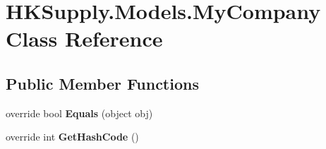 \hypertarget{class_h_k_supply_1_1_models_1_1_my_company}{}\section{H\+K\+Supply.\+Models.\+My\+Company Class Reference}
\label{class_h_k_supply_1_1_models_1_1_my_company}
\subsection*{Public Member Functions}
\begin{DoxyCompactItemize}
\item 
\mbox{\label{class_h_k_supply_1_1_models_1_1_my_company_a25b7f23d1503812b5c1dba3864dd9a01}} 
override bool {\bfseries Equals} (object obj)
\item 
\mbox{\label{class_h_k_supply_1_1_models_1_1_my_company_aad6926d15e84c92fbba9b7a36aed5d3e}} 
override int {\bfseries Get\+Hash\+Code} ()
\end{DoxyCompactItemize}
